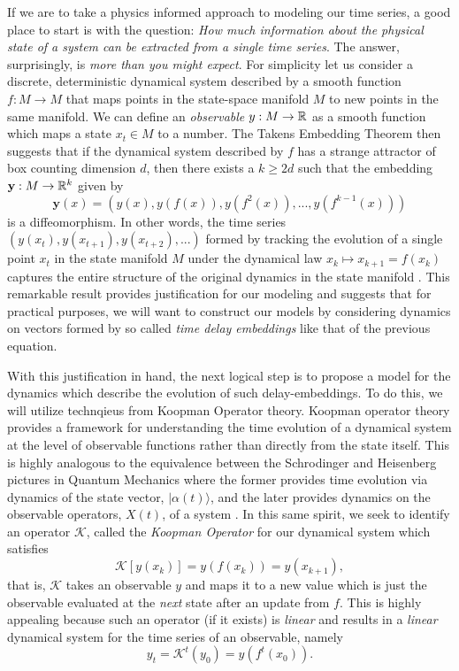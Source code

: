If we are to take a physics informed approach to modeling our time series, a good place to start is with the question: \textit{How much information about the physical state of a system can be extracted from a single time series}. The answer, surprisingly, is \textit{more than you might expect}. For simplicity let us consider a discrete, deterministic dynamical system described by a smooth function $f:M\to M$ that maps points in the state-space manifold $M$ to new points in the same manifold. We can define an \textit{observable} $y:M\to\mathbb{R}$ as a smooth function which maps a state $x_t\in M$ to a number. The Takens Embedding Theorem then suggests that if the dynamical system described by $f$ has a strange attractor of box counting dimension $d$, then there exists a $k\geq 2d$ such that the embedding $\mathbf{y}:M\to\mathbb{R}^k$ given by
\begin{equation}
  \mathbf{y}(x) = \left(y(x), y(f(x)), y(f^2(x)), ..., y(f^{k-1}(x)) \right)
\end{equation}
is a diffeomorphism. In other words, the time series $(y(x_t), y(x_{t+1}), y(x_{t+2}),...)$ formed by tracking the evolution of a single point $x_t$ in the state manifold $M$ under the dynamical law $x_k\mapsto x_{k+1}=f(x_k)$ captures the entire structure of the original dynamics in the state manifold \cite{takens-theorem}. This remarkable result provides justification for our modeling and suggests that for practical purposes, we will want to construct our models by considering dynamics on vectors formed by so called \textit{time delay embeddings} like that of the previous equation.

With this justification in hand, the next logical step is to propose a model for the dynamics which describe the evolution of such delay-embeddings. To do this, we will utilize technqieus from Koopman Operator theory. Koopman operator theory provides a framework for understanding the time evolution of a dynamical system at the level of observable functions rather than directly from the state itself. This is highly analogous to the equivalence between the Schrodinger and Heisenberg pictures in Quantum Mechanics where the former provides time evolution via dynamics of the state vector, $\vert \alpha(t) \rangle$, and the later provides dynamics on the observable operators, $X(t)$, of a system \cite[p 80-84]{sakurai-qm}. In this same spirit, we seek to identify an operator $\mathcal{K}$, called the \textit{Koopman Operator} for our dynamical system which satisfies
\begin{equation}
  \mathcal{K}\left[y(x_k) \right] = y(f(x_k)) = y(x_{k+1}),
\end{equation}
that is, $\mathcal{K}$ takes an observable $y$ and maps it to a new value which is just the observable evaluated at the \textit{next} state after an update from $f$. This is highly appealing because such an operator (if it exists) is \textit{linear} and results in a \textit{linear} dynamical system for the time series of an observable, namely
\begin{equation}
  y_t = \mathcal{K}^t(y_0) = y(f^t(x_0)).
\end{equation}

